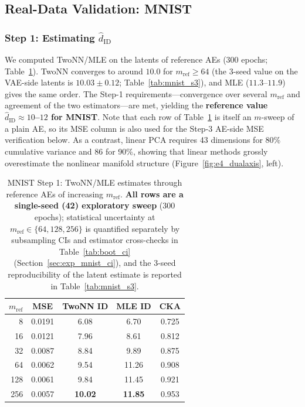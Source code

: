 \documentclass[make,article,submit,pdftex,moreauthors]{Definitions/mdpi}
\newcommand{\hatdID}{\hat{d}_{\mathrm{ID}}}
\begin{document}
\subsection{Real-Data Validation: MNIST}\label{sec:exp_mnist}

\subsubsection{Step 1: Estimating $\hatdID$}

We computed TwoNN/MLE on the latents of reference AEs (300 epochs;
Table~\ref{tab:mnist_s1}).
TwoNN converges to around $10.0$ for $m_{\mathrm{ref}} \geq 64$
(the 3-seed value on the VAE-side latents is $10.03 \pm 0.12$;
Table~\ref{tab:mnist_s3}), and MLE
($11.3$--$11.9$) gives the same order.
The Step-1 requirements---convergence over several $m_{\mathrm{ref}}$ and
agreement of the two estimators---are met, yielding the
\textbf{reference value $\hatdID \approx 10$--$12$ for MNIST}.
Note that each row of Table~\ref{tab:mnist_s1} is itself an $m$-sweep of a
plain AE, so its MSE column is also used for the Step-3 AE-side MSE
verification below.
As a contrast, linear PCA requires 43 dimensions for 80\% cumulative
variance and 86 for 90\%, showing that linear methods grossly overestimate
the nonlinear manifold structure (Figure~\ref{fig:e4_dualaxis}, left).

\begin{table}[H]
\caption{MNIST Step 1: TwoNN/MLE estimates through reference AEs of
increasing $m_{\mathrm{ref}}$. \textbf{All rows are a single-seed (42)
exploratory sweep} (300 epochs); statistical uncertainty at
$m_{\mathrm{ref}} \in \{64, 128, 256\}$ is quantified separately by
subsampling CIs and estimator cross-checks in Table~\ref{tab:boot_ci}
(Section~\ref{sec:exp_mnist_ci}), and the 3-seed reproducibility of the
latent estimate is reported in Table~\ref{tab:mnist_s3}.}
\label{tab:mnist_s1}
\small
\begin{tabular}{rcccc}
\toprule
$m_{\mathrm{ref}}$ & \textbf{MSE} & \textbf{TwoNN ID} & \textbf{MLE ID} & \textbf{CKA} \\
\midrule
8   & 0.0191 & 6.08 & 6.70 & 0.725 \\
16  & 0.0121 & 7.96 & 8.61 & 0.812 \\
32  & 0.0087 & 8.84 & 9.89 & 0.875 \\
64  & 0.0062 & 9.54 & 11.26 & 0.908 \\
128 & 0.0061 & 9.84 & 11.45 & 0.921 \\
256 & 0.0057 & \textbf{10.02} & \textbf{11.85} & 0.953 \\
\bottomrule
\end{tabular}
\end{table}
\end{document}
